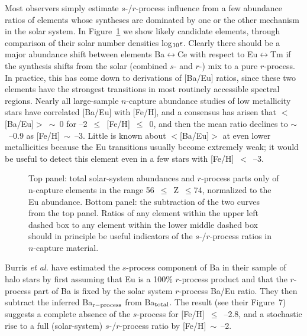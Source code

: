 \documentclass{ws-p8-50x6-00}
\begin{document}
Most observers simply estimate $s$-/$r$-process influence from a few 
abundance ratios of elements whose syntheses are dominated by one or the 
other mechanism in the solar system.  
In Figure~\ref{rs2} we show likely candidate elements, through 
comparison of their solar number densities log$_{\rm 10}\epsilon$. 
Clearly there should be a major abundance shift between elements
Ba$\leftrightarrow$Ce with respect to Eu$\leftrightarrow$Tm if the 
synthesis shifts
from the solar (combined $s$- and $r$-) mix to a pure $r$-process.  
In practice, this has come down to derivations of [Ba/Eu] ratios, since 
these two elements have the strongest transitions in most routinely 
accessible spectral regions.  
Nearly all large-sample $n$-capture abundance studies of low metallicity 
stars have correlated [Ba/Eu] with [Fe/H], and a consensus has arisen 
that $<$[Ba/Eu]$>$~$\sim$~0 for --2~$\leq$~[\rm {Fe/H}]~$\leq$~0, 
and then the mean ratio declines to $\sim$~--0.9 as [Fe/H]~$\sim$~--3.  
Little is known about $<$[Ba/Eu]$>$ at even lower metallicities because
the Eu transitions usually become extremely weak; it would be useful to 
detect this element even in a few stars with [Fe/H]~$<$~--3.
 
\begin{figure}[t]
\epsfxsize=20pc %
\hspace*{0.5in}
\caption{Top panel: total solar-system abundances and $r$-process
parts only of n-capture elements in the range 56~$\leq$~Z~$\leq$74, 
normalized to the Eu abundance.
Bottom panel: the subtraction of the two curves from the top panel.
Ratios of any element within the upper left dashed box to any element
within the lower middle dashed box should in principle be useful
indicators of the $s$-/$r$-process ratios in $n$-capture material.
\label{rs2}}
\end{figure}

Burris {\it et al.}\cite{Bu00} have estimated the $s$-process component of
Ba in their sample of halo stars by first assuming that Eu is a 100\% 
$r$-process product and that the $r$-process part of Ba is fixed by the 
solar system $r$-process Ba/Eu ratio.
They then subtract the inferred Ba$_{\rm r-process}$ from Ba$_{\rm total}$.
The result (see their Figure~7) suggests a complete absence of the 
$s$-process for [Fe/H]~$\leq$~--2.8, and a stochastic rise to a full 
(solar-system) $s$-/$r$-process ratio by [Fe/H]~$\sim$~--2.
\end{document}
